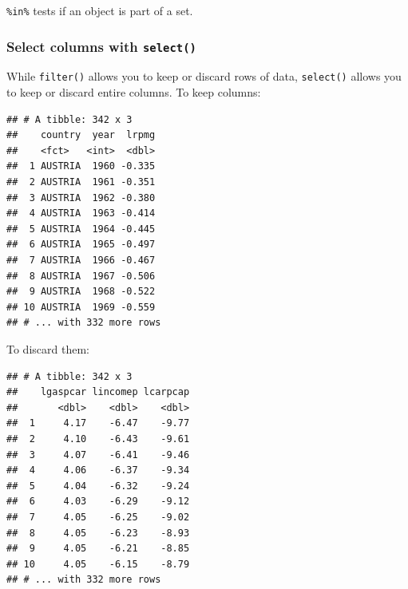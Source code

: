 \documentclass[]{gitbook}
\newenvironment{Shaded}{\begin{snugshade}}{\end{snugshade}}
\newcommand{\KeywordTok}[1]{\textcolor[rgb]{0.13,0.29,0.53}{\textbf{#1}}}
\newcommand{\NormalTok}[1]{#1}
\newcommand{\OperatorTok}[1]{\textcolor[rgb]{0.81,0.36,0.00}{\textbf{#1}}}
\newcommand{\StringTok}[1]{\textcolor[rgb]{0.31,0.60,0.02}{#1}}
\begin{document}
\texttt{\%in\%} tests if an object is part of a set.

\hypertarget{select-columns-with-select}{%
\subsubsection{\texorpdfstring{Select columns with \texttt{select()}}{Select columns with select()}}\label{select-columns-with-select}}

While \texttt{filter()} allows you to keep or discard rows of data, \texttt{select()}
allows you to keep or discard entire columns. To keep columns:

\begin{Shaded}
\end{Shaded}

\begin{verbatim}
## # A tibble: 342 x 3
##    country  year  lrpmg
##    <fct>   <int>  <dbl>
##  1 AUSTRIA  1960 -0.335
##  2 AUSTRIA  1961 -0.351
##  3 AUSTRIA  1962 -0.380
##  4 AUSTRIA  1963 -0.414
##  5 AUSTRIA  1964 -0.445
##  6 AUSTRIA  1965 -0.497
##  7 AUSTRIA  1966 -0.467
##  8 AUSTRIA  1967 -0.506
##  9 AUSTRIA  1968 -0.522
## 10 AUSTRIA  1969 -0.559
## # ... with 332 more rows
\end{verbatim}

To discard them:

\begin{Shaded}
\end{Shaded}

\begin{verbatim}
## # A tibble: 342 x 3
##    lgaspcar lincomep lcarpcap
##       <dbl>    <dbl>    <dbl>
##  1     4.17    -6.47    -9.77
##  2     4.10    -6.43    -9.61
##  3     4.07    -6.41    -9.46
##  4     4.06    -6.37    -9.34
##  5     4.04    -6.32    -9.24
##  6     4.03    -6.29    -9.12
##  7     4.05    -6.25    -9.02
##  8     4.05    -6.23    -8.93
##  9     4.05    -6.21    -8.85
## 10     4.05    -6.15    -8.79
## # ... with 332 more rows
\end{verbatim}
\end{document}
